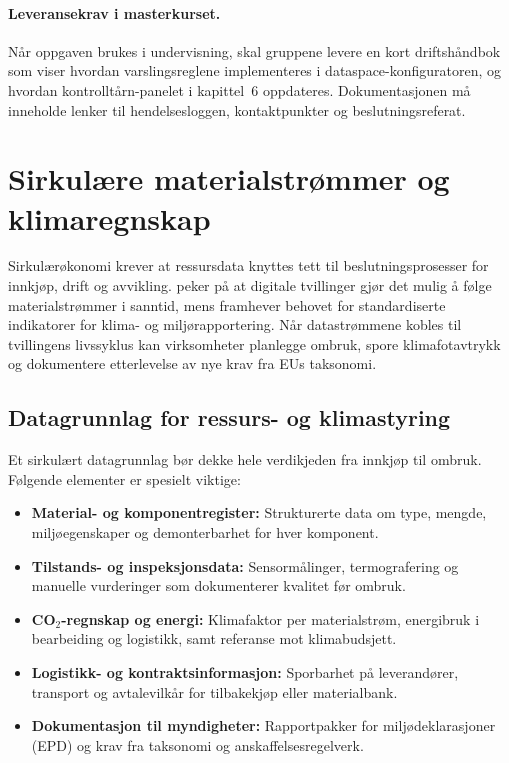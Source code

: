 \paragraph{Leveransekrav i masterkurset.} Når oppgaven brukes i undervisning, skal gruppene levere en kort driftshåndbok som
viser hvordan varslingsreglene implementeres i dataspace-konfiguratoren, og hvordan kontrolltårn-panelet i kapittel~6
oppdateres. Dokumentasjonen må inneholde lenker til hendelsesloggen, kontaktpunkter og beslutningsreferat.

\section{Sirkulære materialstrømmer og klimaregnskap}
Sirkulærøkonomi krever at ressursdata knyttes tett til beslutningsprosesser for innkjøp, drift og avvikling. \citet{norskindustri2023sirkular}
peker på at digitale tvillinger gjør det mulig å følge materialstrømmer i sanntid, mens \citet{miljodir2023materialstrommer} framhever
behovet for standardiserte indikatorer for klima- og miljørapportering. Når datastrømmene kobles til tvillingens livssyklus kan
virksomheter planlegge ombruk, spore klimafotavtrykk og dokumentere etterlevelse av nye krav fra EUs taksonomi.

\subsection{Datagrunnlag for ressurs- og klimastyring}
Et sirkulært datagrunnlag bør dekke hele verdikjeden fra innkjøp til ombruk. Følgende elementer er spesielt viktige:
\begin{itemize}
    \item \textbf{Material- og komponentregister:} Strukturerte data om type, mengde, miljøegenskaper og demonterbarhet for hver komponent.
    \item \textbf{Tilstands- og inspeksjonsdata:} Sensormålinger, termografering og manuelle vurderinger som dokumenterer kvalitet før ombruk.
    \item \textbf{CO$_2$-regnskap og energi:} Klimafaktor per materialstrøm, energibruk i bearbeiding og logistikk, samt referanse mot klimabudsjett.
    \item \textbf{Logistikk- og kontraktsinformasjon:} Sporbarhet på leverandører, transport og avtalevilkår for tilbakekjøp eller materialbank.
    \item \textbf{Dokumentasjon til myndigheter:} Rapportpakker for miljødeklarasjoner (EPD) og krav fra taksonomi og anskaffelsesregelverk.
\end{itemize}

